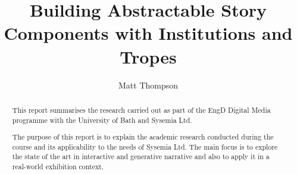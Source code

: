 \documentclass[11pt]{report}
\title{Building Abstractable Story Components with Institutions and Tropes}
\author{Matt Thompson}
\begin{document}
\clearpage
\tableofcontents
\clearpage

\begin{abstract}
This report summarises the research carried out as part of the EngD Digital Media programme with the University of Bath and Sysemia Ltd.

The purpose of this report is to explain the academic research conducted during the course and its applicability to the needs of Sysemia Ltd. The main focus is to explore the state of the art in interactive and generative narrative and also to apply it in a real-world exhibition context.
\end{abstract}

% 

% 
% 
% 
% 





\end{document}

